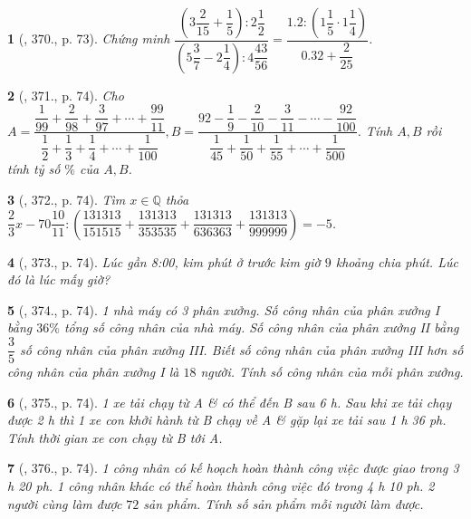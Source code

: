 \documentclass{article}
\newtheorem{baitoan}{}
\begin{document}
\begin{baitoan}[\cite{Tuyen_Toan_6}, 370., p. 73]
	Chứng minh $\dfrac{\left(3\dfrac{2}{15} + \dfrac{1}{5}\right):2\dfrac{1}{2}}{\left(5\dfrac{3}{7} - 2\dfrac{1}{4}\right):4\dfrac{43}{56}} = \dfrac{1.2:\left(1\dfrac{1}{5}\cdot1\dfrac{1}{4}\right)}{0.32 + \dfrac{2}{25}}$.
\end{baitoan}

\begin{baitoan}[\cite{Tuyen_Toan_6}, 371., p. 74]
	Cho $A = \dfrac{\dfrac{1}{99} + \dfrac{2}{98} + \dfrac{3}{97} + \cdots + \dfrac{99}{11}}{\dfrac{1}{2} + \dfrac{1}{3} + \dfrac{1}{4} + \cdots + \dfrac{1}{100}},B = \dfrac{92 - \dfrac{1}{9} - \dfrac{2}{10} - \dfrac{3}{11} - \cdots - \dfrac{92}{100}}{\dfrac{1}{45} + \dfrac{1}{50} + \dfrac{1}{55} + \cdots + \dfrac{1}{500}}$. Tính $A,B$ rồi tính tỷ số $\%$ của $A,B$.
\end{baitoan}

\begin{baitoan}[\cite{Tuyen_Toan_6}, 372., p. 74]
	Tìm $x\in\mathbb{Q}$ thỏa $\dfrac{2}{3}x - 70\dfrac{10}{11}:\left(\dfrac{131313}{151515} + \dfrac{131313}{353535} + \dfrac{131313}{636363} + \dfrac{131313}{999999}\right) = -5$.
\end{baitoan}

\begin{baitoan}[\cite{Tuyen_Toan_6}, 373., p. 74]
	Lúc gần {\rm8:00}, kim phút ở trước kim giờ $9$ khoảng chia phút. Lúc đó là lúc mấy giờ?
\end{baitoan}

\begin{baitoan}[\cite{Tuyen_Toan_6}, 374., p. 74]
	1 nhà máy có 3 phân xưởng. Số công nhân của phân xưởng I bằng $36\%$ tổng số công nhân của nhà máy. Số công nhân của phân xưởng II bằng $\dfrac{3}{5}$ số công nhân của phân xưởng III. Biết số công nhân của phân xưởng III hơn số công nhân của phân xưởng I là $18$ người. Tính số công nhân của mỗi phân xưởng.
\end{baitoan}

\begin{baitoan}[\cite{Tuyen_Toan_6}, 375., p. 74]
	1 xe tải chạy từ A \& có thể đến B sau {\rm6 h}. Sau khi xe tải chạy được {\rm2 h} thì 1 xe con khởi hành từ B chạy về A \& gặp lại xe tải sau {\rm1 h 36 ph}. Tính thời gian xe con chạy từ B tới A.
\end{baitoan}

\begin{baitoan}[\cite{Tuyen_Toan_6}, 376., p. 74]
	1 công nhân có kế hoạch hoàn thành công việc được giao trong {\rm3 h 20 ph}. 1 công nhân khác có thể hoàn thành công việc đó trong {\rm4 h 10 ph}. 2 người cùng làm được $72$ sản phẩm. Tính số sản phẩm mỗi người làm được.
\end{baitoan}
\end{document}
